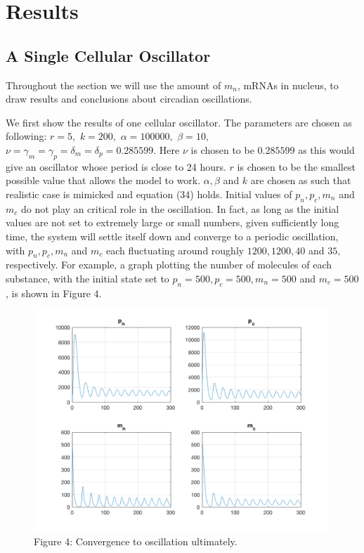 \documentclass[12pt]{article}
\renewcommand{\(}{\left (}
\renewcommand{\)}{\right )}
\begin{document}
\newpage

\section{Results}
\subsection{A Single Cellular Oscillator}
\hspace{5mm} Throughout the section we will use the amount of $m_n$, mRNAs in nucleus, to draw results and conclusions about circadian oscillations.

We first show the results of one cellular oscillator. The parameters are chosen as following: $r = 5,$ $k= 200,$ $\alpha = 100000,$ $\beta = 10,$ $\nu = \gamma_m = \gamma_p = \delta_m =\delta_p = 0.285599.$ Here $\nu$ is chosen to be $0.285599$ as this would give an oscillator whose period is close to 24 hours. $r$ is chosen to be the smallest possible value that allows the model to work. $\alpha, \beta$ and $k$ are chosen as such that realistic case is mimicked and equation (34) holds. Initial values of $p_n, p_c, m_n$ and $m_c$ do not play an critical role in the oscillation. In fact, as long as the initial values are not set to extremely large or small numbers, given sufficiently long time, the system will settle itself down and converge to a periodic oscillation, with $p_n, p_c, m_n$ and $m_c$ each fluctuating around roughly $1200, 1200, 40$ and $35,$ respectively. For example, a graph plotting the number of molecules of each substance, with the initial state set to $p_n = 500, p_c = 500, m_n = 500$ and $m_c = 500$, is shown in Figure 4.
\begin{figure}[h]
    \centering
	\begin{minipage}{0.5\textwidth}
		\centering
		\includegraphics[width=0.99\textwidth]{single_cell_show_convergence.png}
		\caption*{\small Figure 4: Convergence to oscillation ultimately.}
	\end{minipage}

\end{figure}
\end{document}
